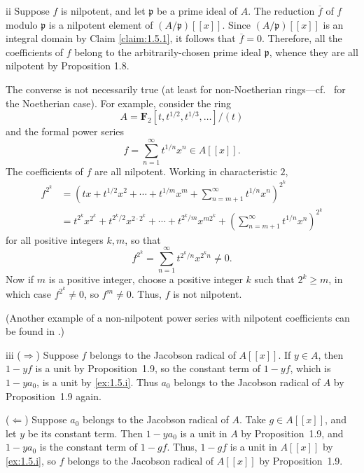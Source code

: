 \begin{partsolution}{1}{5}{ii}
Suppose \(f\) is nilpotent, and let \(\mathfrak p\) be a prime ideal of \(A\).
The reduction \(\overline f\) of \(f\) modulo \(\mathfrak p\) is a nilpotent element of \((A/\mathfrak p)[[x]]\).
Since \((A/\mathfrak p)[[x]]\) is an integral domain by Claim \ref{claim:1.5.1}, it follows that \(\overline f = 0\).
Therefore, all the coefficients of \(f\) belong to the arbitrarily-chosen prime ideal \(\mathfrak p\), whence they are all nilpotent by Proposition 1.8.

The converse is not necessarily true (at least for non-Noetherian rings---cf.~ for the Noetherian case).
For example, consider the ring
\begin{equation*}
A = \mathbf{F}_2[t, t^{1/2}, t^{1/3}, \ldots]/(t)
\end{equation*}
and the formal power series
\begin{equation*}
f = \sum_{n=1}^\infty t^{1/n} x^n \in A[[x]].
\end{equation*}
The coefficients of \(f\) are all nilpotent.
Working in characteristic \(2\),
\begin{align*}
f^{2^k}
&= \left(t x + t^{1/2} x^2 + \cdots + t^{1/m} x^m + \sum_{n = m + 1}^\infty t^{1/n} x^n\right)^{2^k}
\\&= t^{2^k} x^{2^k} + t^{2^k / 2} x^{2\cdot2^k} + \cdots + t^{2^k / m} x^{m 2^k} + \left(\sum_{n = m+1}^\infty t^{1/n} x^n\right)^{2^k}
\end{align*}
for all positive integers \(k, m\), so that
\begin{equation*}
f^{2^k}
= \sum_{n=1}^\infty t^{2^k/n} x^{2^k n} \neq 0.
\end{equation*}
Now if \(m\) is a positive integer, choose a positive integer \(k\) such that \(2^k \geq m\), in which case \(f^{2^k} \neq 0\), so \(f^m \neq 0\).
Thus, \(f\) is not nilpotent.

(Another example of a non-nilpotent power series with nilpotent coefficients can be found in \cite[Example 2]{FieldsZeroDivisors}.)
\end{partsolution}

\begin{partsolution}{1}{5}{iii}
(\(\Rightarrow\))
Suppose \(f\) belongs to the Jacobson radical of \(A[[x]]\).
If \(y \in A\), then \(1 - y f\) is a unit by Proposition~1.9, so the constant term of \(1 - y f\), which is \(1 - y a_0\), is a unit by \ref{ex:1.5.i}.
Thus \(a_0\) belongs to the Jacobson radical of \(A\) by Proposition~1.9 again.

(\(\Leftarrow\))
Suppose \(a_0\) belongs to the Jacobson radical of \(A\).
Take \(g \in A[[x]]\), and let \(y\) be its constant term.
Then \(1 - y a_0\) is a unit in \(A\) by Proposition~1.9, and \(1 - y a_0\) is the constant term of \(1 - g f\).
Thus, \(1 - g f\) is a unit in \(A[[x]]\) by \ref{ex:1.5.i}, so \(f\) belongs to the Jacobson radical of \(A[[x]]\) by Proposition~1.9.
\end{partsolution}


